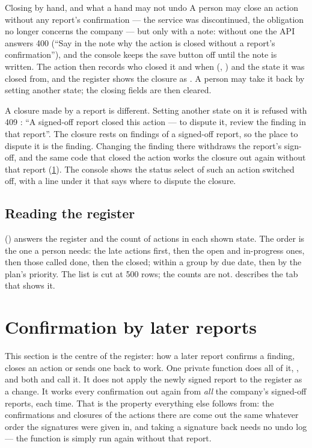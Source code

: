 \begin{humanbox}{Closing by hand, and what a hand may not undo}
A person may close an action without any report's confirmation --- the service was
discontinued, the obligation no longer concerns the company --- but only with a note: without
one the API answers 400  (\enquote{Say in the note why the action is
closed without a report's confirmation}), and the console keeps the save button off until
the note is written. The action then records who closed it and when (,
) and the state it was closed from, and the register shows the closure as
. A person may take it back by setting another state; the closing fields are
then cleared.

\smallskip
A closure made by a report is different. Setting another state on it is refused with 409
: \enquote{A signed-off report closed this action --- to dispute it,
review the finding in that report}. The closure rests on findings of a signed-off report, so
the place to dispute it is the finding. Changing the finding there withdraws the report's
sign-off, and the same code that closed the action works the closure out again without that
report (\cref{sec:register:settle}). The console shows the status select of such an action
switched off, with a line under it that says where to dispute the closure.
\end{humanbox}

\subsection{Reading the register}

 () answers the register and the
count of actions in each shown state. The order is the one a person needs: the late actions
first, then the open and in-progress ones, then those called done, then the closed; within a
group by due date, then by the plan's priority. The list is cut at 500 rows; the counts are
not.  describes the tab that shows it.


\section{Confirmation by later reports}\label{sec:register:settle}

This section is the centre of the register: how a later report confirms a finding, closes an
action or sends one back to work. One private function does all of it, , and both  and  call it. It does not apply the newly signed
report to the register as a change. It works every confirmation out again from \emph{all} the
company's signed-off reports, each time. That is the property everything else follows from:
the confirmations and closures of the actions there are come out the same whatever order the
signatures were given in, and taking a signature back needs no undo log --- the function is simply run again without that report.


